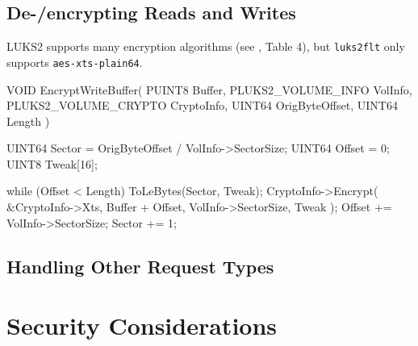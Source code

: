 \subsection{De-/encrypting Reads and Writes}
\label{chap:ourapproach.final.de_encrypting}


LUKS2 supports many encryption algorithms (see \cite{Broz2018}, Table 4), but \texttt{luks2flt} only supports \texttt{aes-xts-plain64}.

\begin{ccode}
VOID
EncryptWriteBuffer(
    PUINT8 Buffer,
    PLUKS2_VOLUME_INFO VolInfo,
    PLUKS2_VOLUME_CRYPTO CryptoInfo,
    UINT64 OrigByteOffset,
    UINT64 Length
)
{
    UINT64 Sector = OrigByteOffset / VolInfo->SectorSize;
    UINT64 Offset = 0;
    UINT8 Tweak[16];

    while (Offset < Length) {
        ToLeBytes(Sector, Tweak);
        CryptoInfo->Encrypt(
            &CryptoInfo->Xts, Buffer + Offset,
            VolInfo->SectorSize, Tweak
        );
        Offset += VolInfo->SectorSize;
        Sector += 1;
    }
}
\end{ccode}

\subsection{Handling Other Request Types}
\label{chap:ourapproach.final.otherrequests}

\section{Security Considerations}
\label{chap:ourapproach.security}





